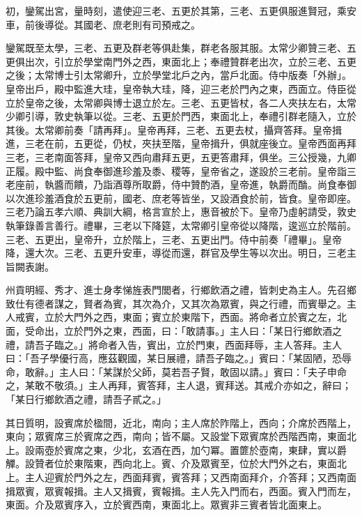 \begin{pinyinscope}
 初，鑾駕出宮，量時刻，遣使迎三老、五更於其第，三老、五更俱服進賢冠，乘安車，前後導從。其國老、庶老則有司預戒之。



 鑾駕既至太學，三老、五更及群老等俱赴集，群老各服其服。太常少卿贊三老、五更俱出次，引立於學堂南門外之西，東面北上；奉禮贊群老出次，立於三老、五更之後；太常博士引太常卿升，立於學堂北戶之內，當戶北面。侍中版奏「外辦」。皇帝出戶，殿中監進大珪，皇帝執大珪，降，迎三老於門內之東，西面立。侍臣從立於皇帝之後，太常卿與博士退立於左。三老、五更皆杖，各二人夾扶左右，太常少卿引導，敦史執筆以從。三老、五更於門西，東面北上，奉禮引群老隨入，立於其後。太常卿前奏「請再拜」。皇帝再拜，三老、五更去杖，攝齊答拜。皇帝揖進，三老在前，五更從，仍杖，夾扶至階，皇帝揖升，俱就座後立。皇帝西面再拜三老，三老南面答拜，皇帝又西向肅拜五更，五更答肅拜，俱坐。三公授幾，九卿正履。殿中監、尚食奉御進珍羞及黍、稷等，皇帝省之，遂設於三老前。皇帝詣三老座前，執醬而饋，乃詣酒尊所取爵，侍中贊酌酒，皇帝進，執爵而酳。尚食奉御以次進珍羞酒食於五更前，國老、庶老等皆坐，又設酒食於前，皆食。皇帝即座。三老乃論五孝六順、典訓大綱，格言宣於上，惠音被於下。皇帝乃虛躬請受，敦史執筆錄善言善行。禮畢，三老以下降筵，太常卿引皇帝從以降階，逡巡立於階前。三老、五更出，皇帝升，立於階上，三老、五更出門。侍中前奏「禮畢」。皇帝降，還大次。三老、五更升安車，導從而還，群官及學生等以次出。明日，三老主旨闕表謝。



 州貢明經、秀才、進士身孝悌旌表門閭者，行鄉飲酒之禮，皆刺史為主人。先召鄉致仕有德者謀之，賢者為賓，其次為介，又其次為眾賓，與之行禮，而賓舉之。主人戒賓，立於大門外之西，東面；賓立於東階下，西面。將命者立於賓之左，北面，受命出，立於門外之東，西面，曰：「敢請事。」主人曰：「某日行鄉飲酒之禮，請吾子臨之。」將命者入告，賓出，立於門東，西面拜辱，主人答拜。主人曰：「吾子學優行高，應茲觀國，某日展禮，請吾子臨之。」賓曰：「某固陋，恐辱命，敢辭。」主人曰：「某謀於父師，莫若吾子賢，敢固以請。」賓曰：「夫子申命之，某敢不敬須。」主人再拜，賓答拜，主人退，賓拜送。其戒介亦如之，辭曰；「某日行鄉飲酒之禮，請吾子貳之。」



 其日質明，設賓席於楹間，近北，南向；主人席於阼階上，西向；介席於西階上，東向；眾賓席三於賓席之西，南向；皆不屬。又設堂下眾賓席於西階西南，東面北上。設兩壺於賓席之東，少北，玄酒在西，加勺冪。置篚於壺南，東肆，實以爵觶。設贊者位於東階東，西向北上。賓、介及眾賓至，位於大門外之右，東面北上。主人迎賓於門外之左，西面拜賓，賓答拜；又西南面拜介，介答拜；又西南面揖眾賓，眾賓報揖。主人又揖賓，賓報揖。主人先入門而右，西面。賓入門而左，東面。介及眾賓序入，立於賓西南，東面北上。眾賓非三賓者皆北面東上。




\end{pinyinscope}
